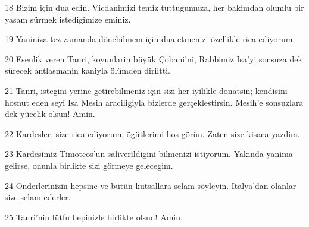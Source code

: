 \par 18 Bizim için dua edin. Vicdanimizi temiz tuttugumuza, her bakimdan olumlu bir yasam sürmek istedigimize eminiz.
\par 19 Yaniniza tez zamanda dönebilmem için dua etmenizi özellikle rica ediyorum.
\par 20 Esenlik veren Tanri, koyunlarin büyük Çobani'ni, Rabbimiz Isa'yi sonsuza dek sürecek antlasmanin kaniyla ölümden diriltti.
\par 21 Tanri, istegini yerine getirebilmeniz için sizi her iyilikle donatsin; kendisini hosnut eden seyi Isa Mesih araciligiyla bizlerde gerçeklestirsin. Mesih'e sonsuzlara dek yücelik olsun! Amin.
\par 22 Kardesler, size rica ediyorum, ögütlerimi hos görün. Zaten size kisaca yazdim.
\par 23 Kardesimiz Timoteos'un saliverildigini bilmenizi istiyorum. Yakinda yanima gelirse, onunla birlikte sizi görmeye gelecegim.
\par 24 Önderlerinizin hepsine ve bütün kutsallara selam söyleyin. Italya'dan olanlar size selam ederler.
\par 25 Tanri'nin lütfu hepinizle birlikte olsun! Amin.


